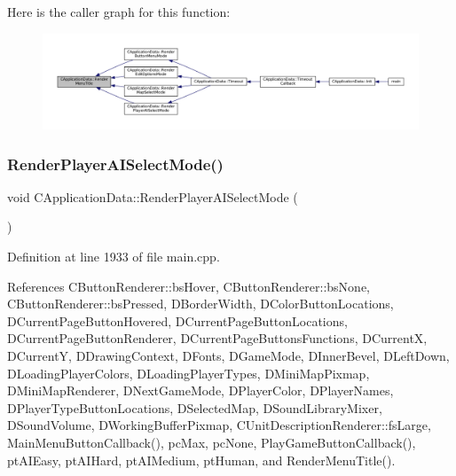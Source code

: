 Here is the caller graph for this function\+:\nopagebreak
\begin{figure}[H]
\begin{center}
\leavevmode
\includegraphics[width=350pt]{classCApplicationData_a548c5924a281c7e226fd7cac44e59920_icgraph}
\end{center}
\end{figure}
\hypertarget{classCApplicationData_a7d46646402ac95a056456e4a3bb353ed}{}\label{classCApplicationData_a7d46646402ac95a056456e4a3bb353ed} 
\subsubsection{\texorpdfstring{Render\+Player\+A\+I\+Select\+Mode()}{RenderPlayerAISelectMode()}}
{\footnotesize\ttfamily void C\+Application\+Data\+::\+Render\+Player\+A\+I\+Select\+Mode (\begin{DoxyParamCaption}{ }\end{DoxyParamCaption})\hspace{0.3cm}{\ttfamily [protected]}}



Definition at line 1933 of file main.\+cpp.



References C\+Button\+Renderer\+::bs\+Hover, C\+Button\+Renderer\+::bs\+None, C\+Button\+Renderer\+::bs\+Pressed, D\+Border\+Width, D\+Color\+Button\+Locations, D\+Current\+Page\+Button\+Hovered, D\+Current\+Page\+Button\+Locations, D\+Current\+Page\+Button\+Renderer, D\+Current\+Page\+Buttons\+Functions, D\+CurrentX, D\+CurrentY, D\+Drawing\+Context, D\+Fonts, D\+Game\+Mode, D\+Inner\+Bevel, D\+Left\+Down, D\+Loading\+Player\+Colors, D\+Loading\+Player\+Types, D\+Mini\+Map\+Pixmap, D\+Mini\+Map\+Renderer, D\+Next\+Game\+Mode, D\+Player\+Color, D\+Player\+Names, D\+Player\+Type\+Button\+Locations, D\+Selected\+Map, D\+Sound\+Library\+Mixer, D\+Sound\+Volume, D\+Working\+Buffer\+Pixmap, C\+Unit\+Description\+Renderer\+::fs\+Large, Main\+Menu\+Button\+Callback(), pc\+Max, pc\+None, Play\+Game\+Button\+Callback(), pt\+A\+I\+Easy, pt\+A\+I\+Hard, pt\+A\+I\+Medium, pt\+Human, and Render\+Menu\+Title().



